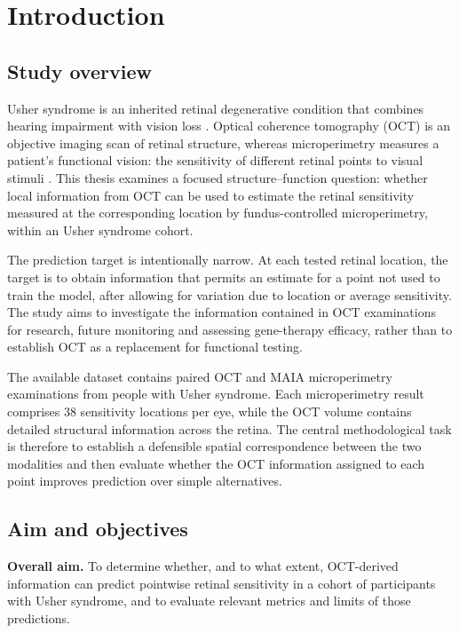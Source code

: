 \chapter{Introduction}
\label{chap:introduction}

\section{Study overview}

Usher syndrome is an inherited retinal degenerative condition that combines hearing impairment with vision loss \cite{Whatley2020,Toualbi2020}. Optical coherence tomography (OCT) is an objective imaging scan of retinal structure, whereas microperimetry measures a patient's functional vision: the sensitivity of different retinal points to visual stimuli \cite{Langlo2025,Pfau2021Microperimetry}. This thesis examines a focused structure--function question: whether local information from OCT can be used to estimate the retinal sensitivity measured at the corresponding location by fundus-controlled microperimetry, within an Usher syndrome cohort.

The prediction target is intentionally narrow. At each tested retinal location, the target is to obtain information that permits an estimate for a point not used to train the model, after allowing for variation due to location or average sensitivity. The study aims to investigate the information contained in OCT examinations for research, future monitoring and assessing gene-therapy efficacy, rather than to establish OCT as a replacement for functional testing.

The available dataset contains paired OCT and MAIA microperimetry examinations from people with Usher syndrome. Each microperimetry result comprises 38 sensitivity locations per eye, while the OCT volume contains detailed structural information across the retina. The central methodological task is therefore to establish a defensible spatial correspondence between the two modalities and then evaluate whether the OCT information assigned to each point improves prediction over simple alternatives.

\section{Aim and objectives}

\textbf{Overall aim.} To determine whether, and to what extent, OCT-derived information can predict pointwise retinal sensitivity in a cohort of participants with Usher syndrome, and to evaluate relevant metrics and limits of those predictions.


